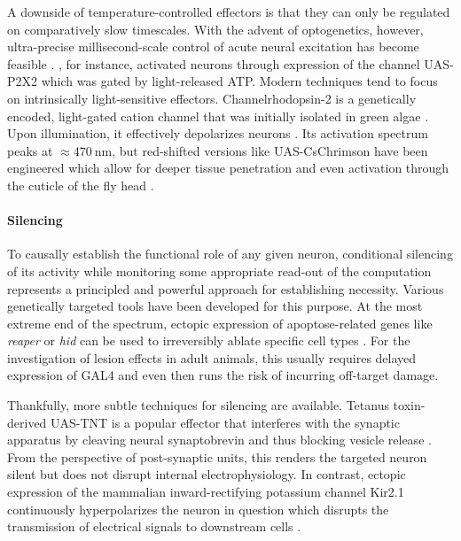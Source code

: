A downside of temperature-controlled effectors is that they can only be regulated on comparatively slow timescales. With the advent of optogenetics, however, ultra-precise millisecond-scale control of acute neural excitation has become feasible \citep{Deisseroth:2011aa}. \citet{Lima:2005aa}, for instance, activated neurons through expression of the channel UAS-P2X2 which was gated by light-released ATP. Modern techniques tend to focus on intrinsically light-sensitive effectors. Channelrhodopsin-2 is a genetically encoded, light-gated cation channel that was initially isolated in green algae \citep{Harz:1991aa,Nagel:2003aa}. Upon illumination, it effectively depolarizes neurons \citep{Boyden:2005aa,Nagel:2005aa}. Its activation spectrum peaks at $\approx\SI{470}{\nano\meter}$, but red-shifted versions like UAS-CsChrimson have been engineered which allow for deeper tissue penetration and even activation through the cuticle of the fly head \citep{Klapoetke:2014aa,Bath:2014aa}.

\paragraph{Silencing}
To causally establish the functional role of any given neuron, conditional silencing of its activity while monitoring some appropriate read-out of the computation represents a principled and powerful approach for establishing necessity. Various genetically targeted tools have been developed for this purpose. At the most extreme end of the spectrum, ectopic expression of apoptose-related genes like \textit{reaper} or \textit{hid} can be used to irreversibly ablate specific cell types \citep{Zhou:1997aa}. For the investigation of lesion effects in adult animals, this usually requires delayed expression of GAL4 and even then runs the risk of incurring off-target damage.

Thankfully, more subtle techniques for silencing are available. Tetanus toxin-derived UAS-TNT is a popular effector that interferes with the synaptic apparatus by cleaving neural synaptobrevin and thus blocking vesicle release \citep{Sweeney:1995tz}. From the perspective of post-synaptic units, this renders the targeted neuron silent but does not disrupt internal electrophysiology. In contrast, ectopic expression of the mammalian inward-rectifying potassium channel Kir2.1 continuously hyperpolarizes the neuron in question which disrupts the transmission of electrical signals to downstream cells \citep{Baines:2001aa}.

